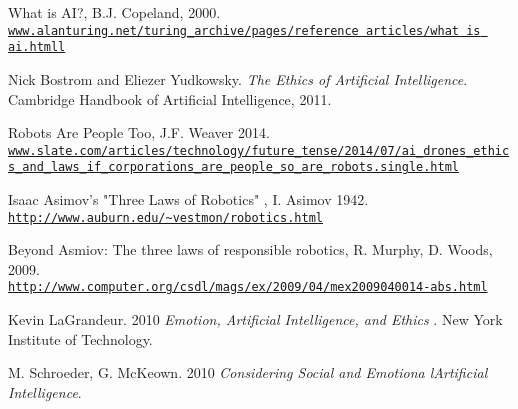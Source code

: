 \documentclass[article]{IEEEtran}
\begin{document}
\begin{thebibliography}{9}

What is AI?, B.J. Copeland, 2000.
\\\texttt{\url{www.alanturing.net/turing_archive/pages/reference articles/what is ai.htmll}}

Nick Bostrom and Eliezer Yudkowsky. 
\textit{The Ethics of Artificial Intelligence}. 
Cambridge Handbook of Artificial Intelligence, 2011.

Robots Are People Too, J.F. Weaver 2014.
\\\texttt{\url{www.slate.com/articles/technology/future_tense/2014/07/ai_drones_ethics_and_laws_if_corporations_are_people_so_are_robots.single.html}}

Isaac Asimov's "Three Laws of Robotics" , I. Asimov 1942.
\\\texttt{\url{http://www.auburn.edu/~vestmon/robotics.html}}

Beyond Asmiov: The three laws of responsible robotics, R. Murphy, D. Woods, 2009.
\\\texttt{\url{http://www.computer.org/csdl/mags/ex/2009/04/mex2009040014-abs.html}}

Kevin LaGrandeur. 2010
\textit{Emotion, Artificial Intelligence, and Ethics }. 
New York Institute of Technology.

M. Schroeder, G. McKeown. 2010
\textit{Considering Social and Emotiona lArtiﬁcial Intelligence}.

\end{thebibliography}
\end{document}
